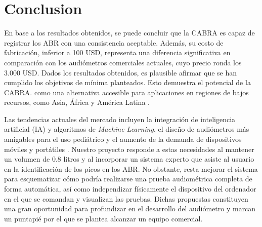 \section{Conclusion} \label{conclusion}

En base a los resultados obtenidos, se puede concluir que la CABRA es capaz de registrar los ABR con una consistencia aceptable. Además, su costo de fabricación, inferior a 100 USD, representa una diferencia significativa en comparación con los audiómetros comerciales actuales, cuyo precio ronda los 3.000 USD. Dados los resultados obtenidos, es plausible afirmar que se han cumplido los objetivos de mínima planteados. Esto demuestra el potencial de la CABRA. como una alternativa accesible para aplicaciones en regiones de bajos recursos, como Asia, África y América Latina \cite{business-research-insights-audiometers}.

Las tendencias actuales del mercado incluyen la integración de inteligencia artificial (IA) y algoritmos de \textit{Machine Learning}, el diseño de audiómetros más amigables para el uso pediátrico y el aumento de la demanda de dispositivos móviles y portátiles \cite{business-research-insights-audiometers}. Nuestro proyecto responde a estas necesidades al mantener un volumen de 0.8 litros y al incorporar un sistema experto que asiste al usuario en la identificación de los picos en los ABR. No obstante, resta mejorar el sistema para esquematizar cómo podría realizarse una prueba audiométrica completa de forma automática, así como independizar físicamente el dispositivo del ordenador en el que se comandan y visualizan las pruebas. Dichas propuestas constituyen una gran oportunidad para profundizar en el desarrollo del audiómetro y marcan un puntapié por el que se plantea alcanzar un equipo comercial.